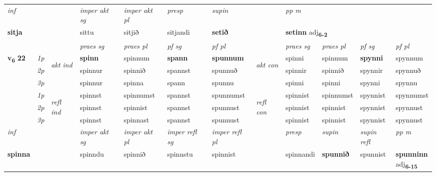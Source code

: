 \begin{longtable}[l]{X>{\footnotesize\itshape}llXXXXlXXXX}
   {\textit{inf}} & &  & \textit{imper akt sg} & \textit{imper akt pl}   & \textit{presp} & \textit{supin}  && \textit{pp m} \\*
  {\textbf{sitja}} & && sittu  & sitjið   & sitjandi &  \textbf{setið}  && \multicolumn{2}{l}{\textbf{setinn} adj\textbf{\textsubscript{6-2}}} \\*

\midrule

 & &   & \textit{praes sg}  & \textit{praes pl}    & \textit{ pf sg} & \textit{pf pl} & & \textit{praes sg}  & \textit{praes pl}    & \textit{pf sg} & \textit{pf pl }  \\ \cmidrule{4-7} \cmidrule{9-12}
 \multirow{2}{*}{{{\textbf{v{\textsubscript{6}}} \Large{\textbf{22}}}}}  & 1p & \multirow{3}{*}{\begin{turn}{90}\textit{akt ind}\end{turn}} & \textbf{spinn} & spinnum & \textbf{spann} & \textbf{spunnum} & \multirow{3}{*}{\begin{turn}{90}\textit{akt con}\end{turn}} &spinni & spinnum & \textbf{spynni} & spynnum\\*
 & 2p &  &  spinnur  & spinnið & spannst & spunnuð & & spinnir & spinnið & spynnir & spynnuð \\*
 & 3p &  & spinnur & spinna & spann & spunnu & & spinni & spinni& spynni & spynnu \\*
\cmidrule{4-7} \cmidrule{9-12}
 & 1p & \multirow{3}{*}{\begin{turn}{90}\textit{refl ind}\end{turn}}  & spinnst & spinnumst & spannst & spunnumst & \multirow{3}{*}{\begin{turn}{90}\textit{refl con}\end{turn}}  &spinnist & spinnumst & spynnist & spynnumst \\*
 & 2p &  & spinnst & spinnist & spannst & spunnust & &spinnist & spinnist & spynnist & spynnust \\*
 & 3p  & & spinnst & spinnast & spannst & spunnust & & spinnist & spinnist& spynnist & spynnust \\*
\cmidrule{4-7} \cmidrule{9-12}

   {\textit{inf}} & &  & \textit{imper akt sg} & \textit{imper akt pl} & \textit{imper refl sg} & \textit{imper refl pl} && \textit{presp} & \textit{supin} & \textit{supin refl} & \textit{pp m} \\*
  {\textbf{spinna}} & && spinndu  & spinnið & spinnstu & spinnist && spinnandi &  \textbf{spunnið} & spunnist & \specialcell{\textbf{spunninn} \\ adj\textbf{\textsubscript{6-15}}} \\*


\end{longtable}
